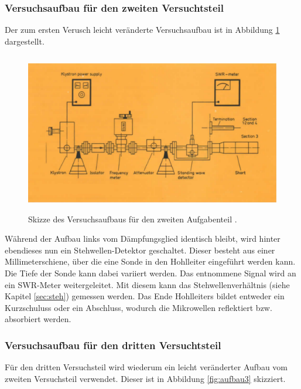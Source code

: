 \subsubsection{Versuchsaufbau für den zweiten Versuchtsteil}
\label{sec:aufbau2}

Der zum ersten Verusch leicht veränderte Versuchsaufbau ist in Abbildung \ref{fig:aufbau2} dargestellt.

\begin{figure}
  \centering
  \includegraphics[height=7cm]{ressources/aufbau2.png}
  \caption{Skizze des Versuchsaufbaus für den zweiten Aufgabenteil \cite{skript}.}
  \label{fig:aufbau2}
\end{figure}

Während der Aufbau links vom Dämpfungsglied identisch bleibt, wird hinter ebendieses nun ein Stehwellen-Detektor geschaltet.
Dieser besteht aus einer Millimeterschiene, über die eine Sonde in den Hohlleiter eingeführt werden kann.
Die Tiefe der Sonde kann dabei variiert werden.
Das entnommene Signal wird an ein SWR-Meter weitergeleitet.
Mit diesem kann das Stehwellenverhältnis (siehe Kapitel \ref{sec:steh}) gemessen werden.
Das Ende Hohlleiters bildet entweder ein Kurzschuluss oder ein Abschluss, wodurch die Mikrowellen reflektiert bzw. absorbiert werden.

\subsubsection{Versuchsaufbau für den dritten Versuchtsteil}
\label{sec:aufbau3}

Für den dritten Versuchsteil wird wiederum ein leicht veränderter Aufbau vom zweiten Versuchsteil verwendet.
Dieser ist in Abbildung \ref{fig:aufbau3} skizziert.

